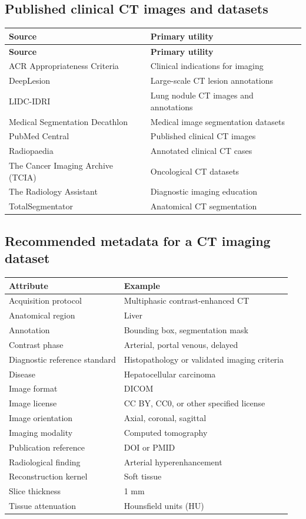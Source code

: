 \subsection{Published clinical CT images and datasets}
\begin{longtable}{@{}p{}p{}@{}}
\toprule
\textbf{Source} & \textbf{Primary utility} \\
\midrule
\endfirsthead
\toprule
\textbf{Source} & \textbf{Primary utility} \\
\midrule
\endhead
ACR Appropriateness Criteria & Clinical indications for imaging \\
DeepLesion & Large-scale CT lesion annotations \\
LIDC-IDRI & Lung nodule CT images and annotations \\
Medical Segmentation Decathlon & Medical image segmentation datasets \\
PubMed Central & Published clinical CT images \\
Radiopaedia & Annotated clinical CT cases \\
The Cancer Imaging Archive (TCIA) & Oncological CT datasets \\
The Radiology Assistant & Diagnostic imaging education \\
TotalSegmentator & Anatomical CT segmentation \\
\bottomrule
\end{longtable}

\subsection{Recommended metadata for a CT imaging dataset}
\begin{longtable}{@{}p{}p{}@{}}
\toprule
\textbf{Attribute} & \textbf{Example} \\
\midrule
Acquisition protocol & Multiphasic contrast-enhanced CT \\
Anatomical region & Liver \\
Annotation & Bounding box, segmentation mask \\
Contrast phase & Arterial, portal venous, delayed \\
Diagnostic reference standard & Histopathology or validated imaging criteria \\
Disease & Hepatocellular carcinoma \\
Image format & DICOM \\
Image license & CC BY, CC0, or other specified license \\
Image orientation & Axial, coronal, sagittal \\
Imaging modality & Computed tomography \\
Publication reference & DOI or PMID \\
Radiological finding & Arterial hyperenhancement \\
Reconstruction kernel & Soft tissue \\
Slice thickness & 1 mm \\
Tissue attenuation & Hounsfield units (HU) \\
\bottomrule
\end{longtable}

